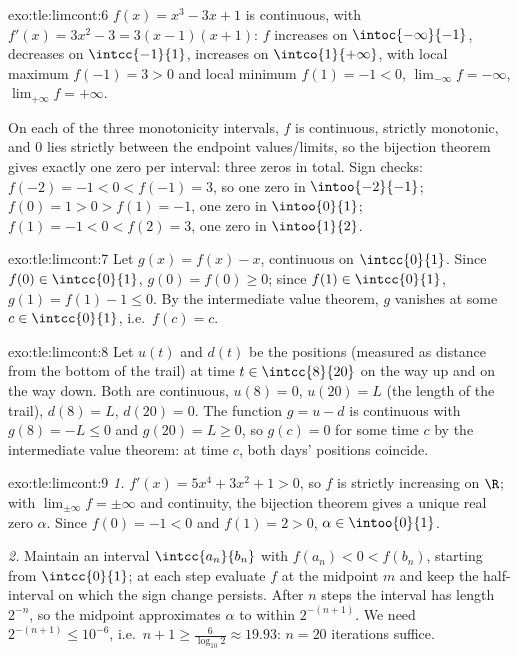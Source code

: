 \begin{solution}{exo:tle:limcont:6}
$f(x) = x^3 - 3x + 1$ is continuous, with $f'(x) = 3x^2 - 3 = 3(x-1)(x+1)$:
$f$ increases on $\intoc{-\infty}{-1}$, decreases on $\intcc{-1}{1}$,
increases on $\intco{1}{+\infty}$, with local maximum $f(-1) = 3 > 0$ and
local minimum $f(1) = -1 < 0$, $\lim_{-\infty} f = -\infty$,
$\lim_{+\infty} f = +\infty$.

On each of the three monotonicity intervals, $f$ is continuous, strictly
monotonic, and $0$ lies strictly between the endpoint values/limits, so the
bijection theorem gives exactly one zero per interval: three zeros in total.
Sign checks: $f(-2) = -1 < 0 < f(-1) = 3$, so one zero in
$\intoo{-2}{-1}$; $f(0) = 1 > 0 > f(1) = -1$, one zero in $\intoo{0}{1}$;
$f(1) = -1 < 0 < f(2) = 3$, one zero in $\intoo{1}{2}$.
\end{solution}

\begin{solution}{exo:tle:limcont:7}
Let $g(x) = f(x) - x$, continuous on $\intcc{0}{1}$. Since
$f(0) \in \intcc{0}{1}$, $g(0) = f(0) \geq 0$; since $f(1) \in \intcc{0}{1}$,
$g(1) = f(1) - 1 \leq 0$. By the intermediate value theorem, $g$ vanishes at
some $c \in \intcc{0}{1}$, i.e.\ $f(c) = c$.
\end{solution}

\begin{solution}{exo:tle:limcont:8}
Let $u(t)$ and $d(t)$ be the positions (measured as distance from the bottom
of the trail) at time $t \in \intcc{8}{20}$ on the way up and on the way
down. Both are continuous, $u(8) = 0$, $u(20) = L$ (the length of the trail),
$d(8) = L$, $d(20) = 0$. The function $g = u - d$ is continuous with
$g(8) = -L \leq 0$ and $g(20) = L \geq 0$, so $g(c) = 0$ for some time $c$ by
the intermediate value theorem: at time $c$, both days' positions coincide.
\end{solution}

\begin{solution}{exo:tle:limcont:9}
\emph{1.} $f'(x) = 5x^4 + 3x^2 + 1 > 0$, so $f$ is strictly increasing on
$\R$; with $\lim_{\pm\infty} f = \pm\infty$ and continuity, the bijection
theorem gives a unique real zero $\alpha$. Since $f(0) = -1 < 0$ and
$f(1) = 2 > 0$, $\alpha \in \intoo{0}{1}$.

\emph{2.} Maintain an interval $\intcc{a_n}{b_n}$ with
$f(a_n) < 0 < f(b_n)$, starting from $\intcc{0}{1}$; at each step evaluate
$f$ at the midpoint $m$ and keep the half-interval on which the sign change
persists. After $n$ steps the interval has length $2^{-n}$, so the midpoint
approximates $\alpha$ to within $2^{-(n+1)}$. We need
$2^{-(n+1)} \leq 10^{-6}$, i.e.\ $n + 1 \geq \frac{6}{\log_{10} 2} \approx 19.93$:
$n = 20$ iterations suffice.
\end{solution}
